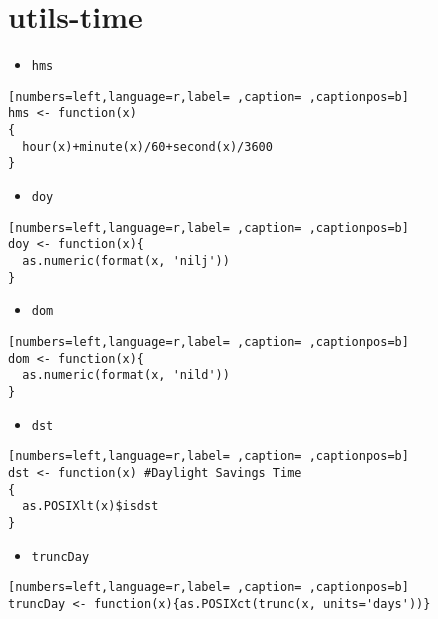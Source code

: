 \section{utils-time}
\label{sec:orgd1c54e0}
\begin{itemize}
\item \texttt{hms}
\end{itemize}
\begin{lstlisting}[numbers=left,language=r,label= ,caption= ,captionpos=b]
hms <- function(x)
{
  hour(x)+minute(x)/60+second(x)/3600
}
\end{lstlisting}
\begin{itemize}
\item \texttt{doy}
\end{itemize}
\begin{lstlisting}[numbers=left,language=r,label= ,caption= ,captionpos=b]
doy <- function(x){
  as.numeric(format(x, 'nilj'))
}
\end{lstlisting}
\begin{itemize}
\item \texttt{dom}
\end{itemize}
\begin{lstlisting}[numbers=left,language=r,label= ,caption= ,captionpos=b]
dom <- function(x){
  as.numeric(format(x, 'nild'))
}
\end{lstlisting}
\begin{itemize}
\item \texttt{dst}
\end{itemize}
\begin{lstlisting}[numbers=left,language=r,label= ,caption= ,captionpos=b]
dst <- function(x) #Daylight Savings Time
{
  as.POSIXlt(x)$isdst
}
\end{lstlisting}
\begin{itemize}
\item \texttt{truncDay}
\end{itemize}
\begin{lstlisting}[numbers=left,language=r,label= ,caption= ,captionpos=b]
truncDay <- function(x){as.POSIXct(trunc(x, units='days'))}
\end{lstlisting}
